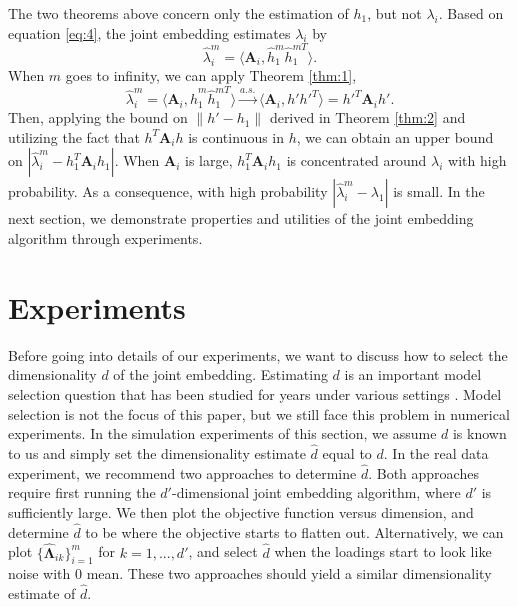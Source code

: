 \documentclass[10pt,journal,compsoc]{IEEEtran}
\newcommand{\bA}{\mathbf{A}}
\newcommand{\bLambda}{\mathbf{\Lambda}}
\begin{document}
\noindent The two theorems above concern only the estimation of $h_1$, but not $\lambda_i$. Based on equation \eqref{eq:4}, the joint embedding estimates $\lambda_i$ by
\[\hat{\lambda}_i^m= \langle \bA_i,\hat{h}_1^m \hat{h}_1^{m T} \rangle. \]
When $m$ goes to infinity, we can apply Theorem \ref{thm:1},
\[\hat{\lambda}_i^m = \langle \bA_i,\hat{h}_1^m \hat{h}_1^{mT} \rangle \overset{a.s.}{\rightarrow} \langle \bA_i,h' h'^T \rangle = h'^T \bA_i h'.\]
Then, applying the bound on $\|h'-h_1\|$ derived in Theorem \ref{thm:2} and utilizing the fact that $h^T \bA_i h$ is continuous in $h$, we can obtain an upper bound on $|\hat{\lambda}_i^m - h_1^T \bA_i h_1|$. When $\bA_i$ is large, $h_1^T \bA_i h_1$ is concentrated around $\lambda_i$ with high probability. As a consequence, with high probability $|\hat{\lambda}_i^m - \lambda_1|$ is small. In the next section, we demonstrate properties and utilities of the joint embedding algorithm through experiments. 

\section{Experiments}
Before going into details of our experiments, we want to discuss how to select the dimensionality $d$ of the joint embedding. Estimating $d$ is an important model selection question that has been studied for years under various settings \cite{kohavi1995study}. Model selection is not the focus of this paper, but we still face this problem in numerical experiments. In the simulation experiments of this section, we assume $d$ is known to us and simply set the dimensionality estimate $\hat{d}$ equal to $d$. In the real data experiment, we recommend two approaches to determine $\hat{d}$. Both approaches require first running the $d'$-dimensional joint embedding algorithm, where $d'$ is sufficiently large. We then plot the objective function versus dimension, and determine $\hat{d}$ to be where the objective starts to flatten out. Alternatively, we can plot $\{\hat{\bLambda}_{ik}\}_{i=1}^m$ for $k=1,...,d'$, and select $\hat{d}$ when the loadings start to look like noise with $0$ mean. These two approaches should yield a similar dimensionality estimate of $\hat{d}$. 
\end{document}
